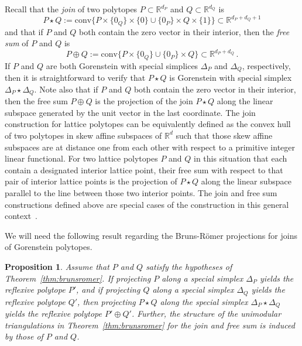 \documentclass[12pt]{amsart}
\newtheorem{proposition}[theorem]{Proposition}
\theoremstyle{definition}
\newcommand{\defn}[1]{\emph{\color{blue} #1}}
\newcommand\R{\mathbb{R}}
\begin{document}
Recall that the \defn{join} of two polytopes $P\subset \R^{d_P}$ and $Q\subset \R^{d_Q}$ is 
\[
P\star Q := \mathrm{conv}\{P\times\{0_Q\}\times \{0\}\cup \{0_P\}\times Q \times \{1\} \}\subset \R^{d_P+d_Q+1}
\]
and that if $P$ and $Q$ both contain the zero vector in their interior, then the \defn{free sum} of $P$ and $Q$ is
\[
P\oplus Q := \mathrm{conv}\{P\times\{0_Q\} \cup \{0_P\}\times Q \}\subset \R^{d_P+d_Q} \, .
\]
If $P$ and $Q$ are both Gorenstein with special simplices $\Delta_P$ and $\Delta_Q$, respectively, then it is straightforward to verify that $P\star Q$ is Gorenstein with special simplex $\Delta_P\star \Delta_Q$.
Note also that if $P$ and $Q$ both contain the zero vector in their interior, then the free sum $P\oplus Q$ is the projection of the join $P\star Q$ along the linear subspace generated by the unit vector in the last coordinate.
The join construction for lattice polytopes can be equivalently defined as the convex hull of two polytopes in skew affine subspaces of $\R^d$ such that those skew affine subspaces are at distance one from each other with respect to a primitive integer linear functional.
For two lattice polytopes $P$ and $Q$ in this situation that each contain a designated interior lattice point, their free sum with respect to that pair of interior lattice points is the projection of $P\star Q$ along the linear subspace parallel to the line between those two interior points. 
The join and free sum constructions defined above are special cases of the construction in this general context~\cite{hrz97,m76,ps67}.

We will need the following result regarding the Bruns-R\"omer projections for joins of Gorenstein polytopes.

\begin{proposition}\label{prop:joinfreesumgorenstein}
    Assume that $P$ and $Q$ satisfy the hypotheses of Theorem~\ref{thm:brunsromer}.
    If projecting $P$ along a special simplex $\Delta_P$ yields the reflexive polytope $P'$, and if projecting $Q$ along a special simplex $\Delta_Q$ yields the reflexive polytope $Q'$, then projecting $P\star Q$ along the special simplex $\Delta_P\star \Delta_Q$ yields the reflexive polytope $P'\oplus Q'$.
    Further, the structure of the unimodular triangulations in Theorem~\ref{thm:brunsromer} for the join and free sum is induced by those of $P$ and $Q$.
\end{proposition}
\end{document}
